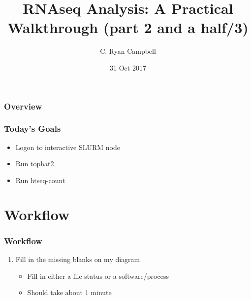\documentclass[14pt,handout]{beamer}
\title[RNAseq Practical pt2/3]{RNAseq Analysis: A Practical Walkthrough (part 2 and a half/3)} %
\author{C. Ryan Campbell} %
\institute[Duke] %
{
Duke University \\ %
\medskip
\textit{c.ryan.campbell@duke.edu} %
}
\date{31 Oct 2017} %
\begin{document}
\begin{frame}
\titlepage %
\end{frame}

\begin{frame}
\frametitle{Overview} %
\tableofcontents %
\end{frame}


\begin{frame}
\frametitle{Today's Goals}
\begin{itemize}
	\item<+-> Logon to interactive SLURM node
	\item<+-> Run tophat2
	\item<+-> Run htseq-count
\end{itemize}
\end{frame}

\section{Workflow}

\begin{frame}
\frametitle{Workflow}
\begin{enumerate}
	\large
	\item<+-> Fill in the missing blanks on my diagram
	\begin{itemize}
		\item<+-> Fill in either a file status or a software/process
		\item<+-> Should take about 1 minute
	\end{itemize}
\end{enumerate}
\end{frame}
\end{document}
